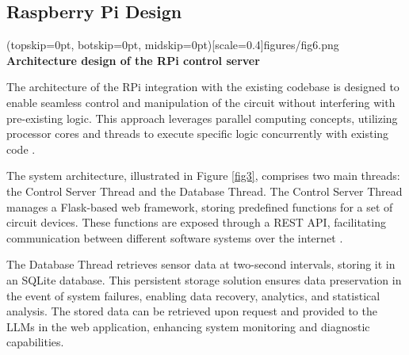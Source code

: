 \documentclass{ieeeaccess}
\begin{document}
\subsection{Raspberry Pi Design}

\Figure[t!](topskip=0pt, botskip=0pt,
midskip=0pt)[scale=0.4]{{figures/fig6.png}}
{ \textbf{Architecture design of the RPi control server}\label{fig3}}

The architecture of the RPi integration with the existing codebase is designed to enable seamless control and manipulation of the circuit without interfering with pre-existing logic. This approach leverages parallel computing concepts, utilizing processor cores and threads to execute specific logic concurrently with existing code \cite{wilkinson2005parallel}.

The system architecture, illustrated in Figure  \ref{fig3}, comprises two main threads: the Control Server Thread and the Database Thread. The Control Server Thread manages a Flask-based web framework, storing predefined functions for a set of circuit devices. These functions are exposed through a REST API, facilitating communication between different software systems over the internet \cite{Surwase2016RESTAM}.

The Database Thread retrieves sensor data at two-second intervals, storing it in an SQLite database. This persistent storage solution ensures data preservation in the event of system failures, enabling data recovery, analytics, and statistical analysis. The stored data can be retrieved upon request and provided to the LLMs in the web application, enhancing system monitoring and diagnostic capabilities.
\end{document}
